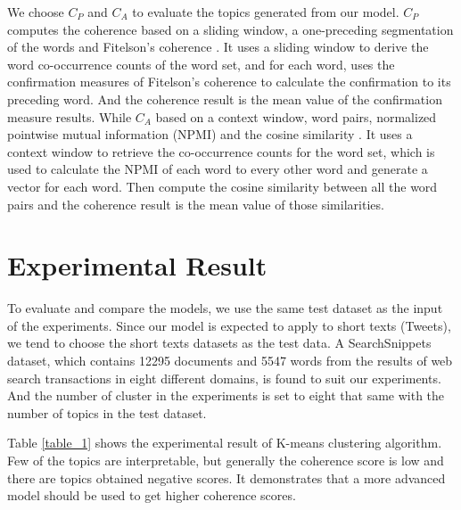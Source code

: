 We choose $C_P$ and $C_A$ to evaluate the topics generated from our model. $C_P$ computes the coherence based on a sliding window, a one-preceding segmentation of the words and Fitelson's coherence \cite{m2020topic}. It uses a sliding window to derive the word co-occurrence counts of the word set, and for each word, uses the confirmation measures of Fitelson's coherence to calculate the confirmation to its preceding word. And the coherence result is the mean value of the confirmation measure results. While $C_A$ based on a context window, word pairs, normalized pointwise mutual information (NPMI) and the cosine similarity \cite{m2020topic}. It uses a context window to retrieve the co-occurrence counts for the word set, which is used to calculate the NPMI of each word to every other word and generate a vector for each word. Then compute the cosine similarity between all the word pairs and the coherence result is the mean value of those similarities.

\section{Experimental Result}

To evaluate and compare the models, we use the same test dataset as the input of the experiments. Since our model is expected to apply to short texts (Tweets), we tend to choose the short texts datasets as the test data. A SearchSnippets dataset, which contains 12295 documents and 5547 words from the results of web search transactions in eight different domains, is found to suit our experiments. And the number of cluster in the experiments is set to eight that same with the number of topics in the test dataset. 

Table \ref{table_1} shows the experimental result of K-means clustering algorithm. Few of the topics are interpretable, but generally the coherence score is low and there are topics obtained negative scores. It demonstrates that a more advanced model should be used to get higher coherence scores.


